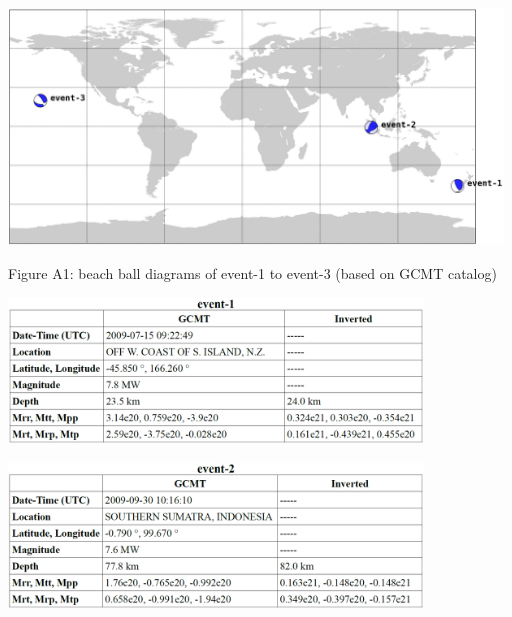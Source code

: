 \documentclass{article}
\begin{document}
\begin{center}
\includegraphics[width=372pt, height=178pt, keepaspectratio=true]{AXISEMTutorial-fig001.png}

{\small{}Figure A1: beach ball diagrams of event-1 to event-3 (based on GCMT catalog)}

\vspace{1cm}
\includegraphics[width=312pt, height=110pt, keepaspectratio=true]{AXISEMTutorial-fig002.png}

\vspace{1cm}
\includegraphics[width=312pt, height=110pt, keepaspectratio=true]{AXISEMTutorial-fig003.png}


\end{center}
\end{document}
